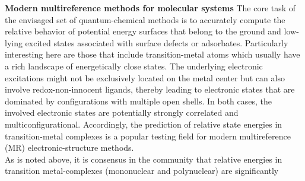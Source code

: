 \documentclass[a4paper,11pt,headings=normal]{scrartcl}
\begin{document}
\noindent
\textbf{Modern multireference methods for molecular systems} 
The core task of the envisaged set of quantum-chemical methods is to accurately 
compute the relative behavior of potential energy surfaces that belong to 
the ground and low-lying excited states associated with surface defects or 
adsorbates. Particularly interesting here are those that include transition-metal 
atoms which usually have a rich landscape of energetically close 
states.\autocite{Chan2019, Hirsch2025} 
The underlying electronic excitations might not be exclusively located 
on the metal center but can also involve redox-non-innocent ligands, thereby 
leading to electronic states that are dominated by configurations with multiple 
open shells.\autocite{Nam2024} In both cases, the involved 
electronic states are potentially strongly correlated and multiconfigurational. 
Accordingly, the prediction of relative state energies in transition-metal
complexes is a popular testing field for modern multireference (MR) 
electronic-structure methods.\autocite{Radon2018, LiManni2021, 
Pantazis2022, Evangelista2024}\\
\ifoot{}
\ofoot{}
 As is noted above, it is consensus in the community that relative energies in 
transition metal-complexes (mononuclear and polynuclear) are significantly 
\end{document}
